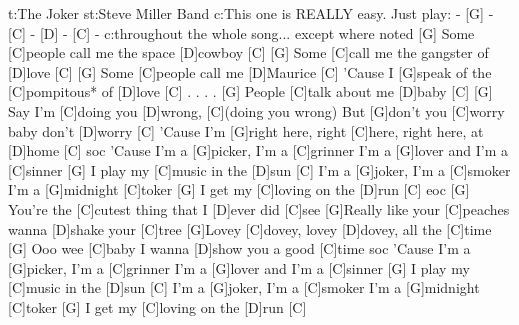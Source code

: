 {t:The Joker}
{st:Steve Miller Band}
{c:This one is REALLY easy. Just play: - [G]  -  [C]  -  [D]  -  [C]  - }
{c:throughout the whole song... except where noted}
[G]  Some [C]people call me the space [D]cowboy  [C]
[G]  Some [C]call me the gangster of [D]love  [C]
[G]  Some [C]people call me [D]Maurice  [C]
'Cause I [G]speak of the [C]pompitous* of [D]love  [C]
. . . .
[G]  People [C]talk about me [D]baby  [C]
[G]  Say I'm [C]doing you [D]wrong, [C](doing you wrong)
But [G]don't you [C]worry baby don't [D]worry  [C]
'Cause I'm [G]right here, right [C]here, right here, at [D]home  [C]
{soc}
'Cause I'm a [G]picker, I'm a [C]grinner
I'm a [G]lover and I'm a [C]sinner
[G]  I play my [C]music in the [D]sun  [C]
I'm a [G]joker, I'm a [C]smoker
I'm a [G]midnight [C]toker
[G]  I get my [C]loving on the [D]run   [C]
{eoc}
[G]  You're the [C]cutest thing that I [D]ever did [C]see
[G]Really like your [C]peaches wanna [D]shake your [C]tree
[G]Lovey [C]dovey, lovey [D]dovey, all the [C]time
[G]  Ooo wee [C]baby I wanna [D]show you a good [C]time
{soc}
'Cause I'm a [G]picker, I'm a [C]grinner
I'm a [G]lover and I'm a [C]sinner
[G]  I play my [C]music in the [D]sun  [C]
I'm a [G]joker, I'm a [C]smoker
I'm a [G]midnight [C]toker
[G]  I get my [C]loving on the [D]run   [C]
